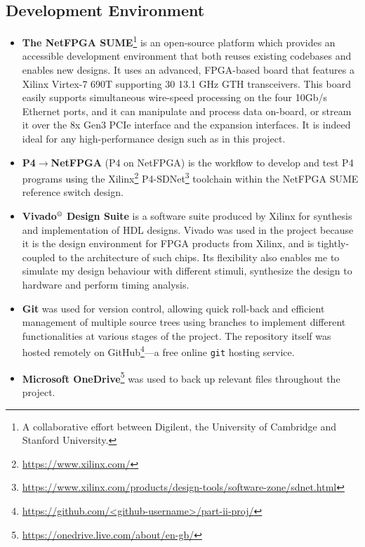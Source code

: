 \subsection{Development Environment}
\begin{itemize}[leftmargin=*, noitemsep, nosep] %
	\item \textbf{The NetFPGA SUME}\footnote{A collaborative effort between Digilent, the University of Cambridge and Stanford University.} \cite{netfpgasume} is an open-source platform which provides an accessible development environment that both reuses existing codebases and enables new designs. It uses an advanced, FPGA-based board that features a Xilinx Virtex-7 690T supporting 30 13.1 GHz GTH transceivers. This board easily supports simultaneous wire-speed processing on the four 10Gb/s Ethernet ports, and it can manipulate and process data on-board, or stream it over the 8x Gen3 PCIe interface and the expansion interfaces. It is indeed ideal for any high-performance design such as in this project.
	
	\item \textbf{P4$\rightarrow$NetFPGA} (P4 on NetFPGA) is the workflow to develop and test P4 programs using the Xilinx\footnote{\url{https://www.xilinx.com/}} P4-SDNet\footnote{\url{https://www.xilinx.com/products/design-tools/software-zone/sdnet.html}} toolchain within the NetFPGA SUME reference switch design.
	
	\item \textbf{Vivado$^{\textrm{\textregistered}}$ Design Suite} is a software suite produced by Xilinx for synthesis and implementation of HDL designs. Vivado was used in the project because it is the design environment for FPGA products from Xilinx, and is tightly-coupled to the architecture of such chips. Its flexibility also enables me to simulate my design behaviour with different stimuli, synthesize the design to hardware and perform timing analysis.
	
	\item \textbf{Git} was used for version control, allowing quick roll-back and efficient management of multiple source trees using branches to implement different functionalities at various stages of the project. The repository itself was hosted remotely on GitHub\footnote{\url{https://github.com/<github-username>/part-ii-proj/}}---a free online \texttt{git} hosting service.
	
	\item \textbf{Microsoft OneDrive}\footnote{\url{https://onedrive.live.com/about/en-gb/}} was used to back up relevant files throughout the project.
\end{itemize}

